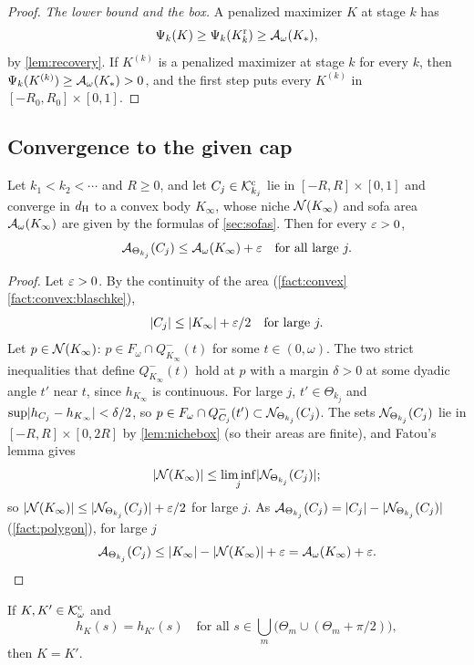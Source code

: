 \begin{proof}
\emph{The lower bound and the box.} A penalized maximizer $K$ at stage $k$ has
\[
  \Psi_k(K)\ge\Psi_k(K^{\mathrm r}_k)\ge\mathcal{A}_\omega(K_*),
\]
by \cref{lem:recovery}. If $K^{(k)}$ is a penalized maximizer at stage $k$ for
every $k$, then $\Psi_k(K^{(k)})\ge\mathcal{A}_\omega(K_*)>0$, and the first step puts
every $K^{(k)}$ in ${[-R_0,R_0]\times[0,1]}$.
\end{proof}

\subsection{Convergence to the given cap}

\begin{lemma}\label{lem:limsup}
Let ${k_1<k_2<\cdots}$ and $R\ge0$, and let $C_j\in\mathcal{K}^{\mathrm{c}}_{k_j}$ lie in
$[-R,R]\times[0,1]$ and converge in $d_{\mathrm{H}}$ to a convex body $K_\infty$, whose
niche $\mathcal{N}(K_\infty)$ and sofa area $\mathcal{A}_\omega(K_\infty)$ are given by the
formulas of \cref{sec:sofas}. Then for every $\varepsilon>0$,
\[
  \mathcal{A}_{\Theta_{k_j}}(C_j)\le\mathcal{A}_\omega(K_\infty)+\varepsilon
    \quad\text{for all large }j.
\]
\end{lemma}

\begin{proof}
Let $\varepsilon>0$. By the continuity of the area
(\cref{fact:convex}\ref{fact:convex:blaschke}),
\[
  \lvert C_j\rvert\le\lvert K_\infty\rvert+\varepsilon/2\quad\text{for large }j.
\]
Let $p\in\mathcal{N}(K_\infty)$: $p\in F_\omega\cap Q_{K_\infty}^-(t)$ for some
$t\in(0,\omega)$. The two strict inequalities that define $Q^-_{K_\infty}(t)$
hold at $p$ with a margin $\delta>0$ at some dyadic angle $t'$ near $t$, since
$h_{K_\infty}$ is continuous. For large $j$, $t'\in\Theta_{k_j}$ and
$\sup\lvert h_{C_j}-h_{K_\infty}\rvert<\delta/2$, so $p\in F_\omega\cap
Q^-_{C_j}(t')\subset\mathcal{N}_{\Theta_{k_j}}(C_j)$. The sets $\mathcal{N}_{\Theta_{k_j}}(C_j)$
lie in $[-R,R]\times[0,2R]$ by \cref{lem:nichebox} (so their areas are finite),
and Fatou's lemma gives
\[
  \lvert \mathcal{N}(K_\infty)\rvert\le\liminf_j\lvert \mathcal{N}_{\Theta_{k_j}}(C_j)\rvert;
\]
so $\lvert \mathcal{N}(K_\infty)\rvert\le\lvert \mathcal{N}_{\Theta_{k_j}}(C_j)\rvert+\varepsilon/2$ for large $j$.
As $\mathcal{A}_{\Theta_{k_j}}(C_j)=\lvert C_j\rvert-\lvert \mathcal{N}_{\Theta_{k_j}}(C_j)\rvert$
(\cref{fact:polygon}), for large $j$
\[
  \mathcal{A}_{\Theta_{k_j}}(C_j)\le\lvert K_\infty\rvert-\lvert \mathcal{N}(K_\infty)\rvert+\varepsilon
    =\mathcal{A}_\omega(K_\infty)+\varepsilon .\qedhere
\]
\end{proof}

\begin{lemma}\label{lem:dyadic}
If $K,K'\in\mathcal{K}^{\mathrm{c}}_\omega$ and
\[
  h_K(s)=h_{K'}(s)
    \quad\text{for all }s\in\bigcup_m\bigl(\Theta_m\cup(\Theta_m+\pi/2)\bigr),
\]
then $K=K'$.
\end{lemma}

